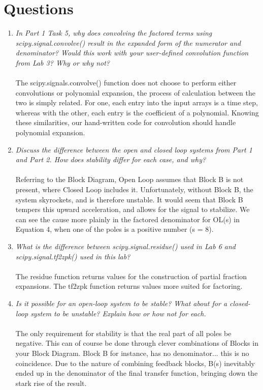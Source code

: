 \documentclass[12pt]{report}
\begin{document}
\pagebreak

\section{Questions}
\begin{enumerate}
    \item \textit{In Part 1 Task 5, why does convolving the factored terms using scipy.signal.convolve()
result in the expanded form of the numerator and denominator? Would this work with your
user-defined convolution function from Lab 3? Why or why not?}\\\\
    The scipy.signals.convolve() function does not choose to perform either convolutions or polynomial expansion, the process of calculation between the two is simply related. For one, each entry into the input arrays is a time step, whereas with the other, each entry is the coefficient of a polynomial. Knowing these similarities, our hand-written code for convolution should handle polynomial expansion.
    \item \textit{Discuss the difference between the open and closed loop systems from Part 1 and Part 2. How does stability differ for each case, and why?}\\\\
    Referring to the Block Diagram, Open Loop assumes that Block B is not present, where Closed Loop includes it. Unfortunately, without Block B, the system skyrockets, and is therefore unstable. It would seem that Block B tempers this upward acceleration, and allows for the signal to stabilize. We can see the cause more plainly in the factored denominator for OL(s) in Equation 4, when one of the poles is a positive number (s = 8).
    \item \textit{What is the difference between scipy.signal.residue() used in Lab 6 and scipy.signal.tf2zpk() used in this lab?}\\\\
    The residue function returns values for the construction of partial fraction expansions. The tf2zpk function returns values more suited for factoring.
    \item \textit{Is it possible for an open-loop system to be stable? What about for a closed-loop system to be unstable? Explain how or how not for each.}\\\\
    The only requirement for stability is that the real part of all poles be negative. This can of course be done through clever combinations of Blocks in your Block Diagram. Block B for instance, has no denominator... this is no coincidence. Due to the nature of combining feedback blocks, B(s) inevitably ended up in the denominator of the final transfer function, bringing down the stark rise of the result.
\end{enumerate}
\end{document}
